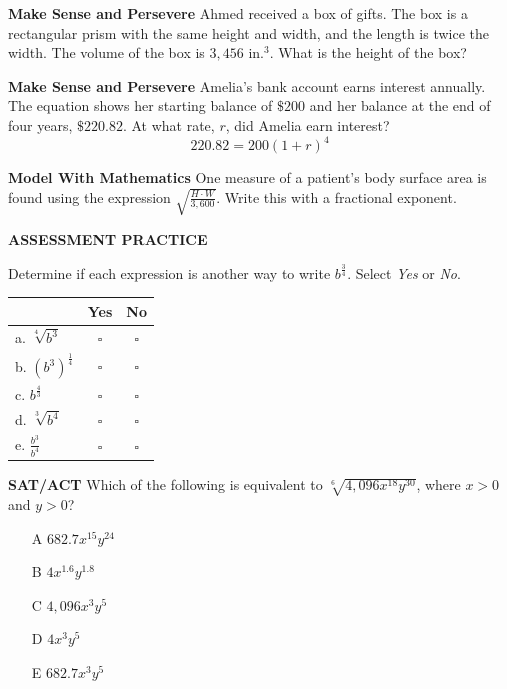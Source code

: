 \documentclass{article}
\newenvironment{practice}[2]{}{}
\newcommand{\placeholder}[2]{}
\begin{document}
\begin{practice}{45}{}
\textbf{Make Sense and Persevere} Ahmed received a box of gifts. The box is a rectangular prism with the same height and width, and the length is twice the width. The volume of the box is $3,456 \text{ in.}^3$. What is the height of the box?

\placeholder{illustration}{A rectangular prism box labeled 'Mystery BOX' with gifts flowing out. Dimensions marked: depth is $x \text{ in.}$, height is $x \text{ in.}$, width is $2x \text{ in.}$}
\end{practice}

\begin{practice}{46}{}
\textbf{Make Sense and Persevere} Amelia's bank account earns interest annually. The equation shows her starting balance of $\$200$ and her balance at the end of four years, $\$220.82$. At what rate, $r$, did Amelia earn interest?
\[ 220.82 = 200(1 + r)^4 \]
\end{practice}

\begin{practice}{47}{}
\textbf{Model With Mathematics} One measure of a patient's body surface area is found using the expression $\sqrt{\frac{H \cdot W}{3,600}}$. Write this with a fractional exponent.
\end{practice}

\textbf{ASSESSMENT PRACTICE}

\begin{practice}{48}{}
Determine if each expression is another way to write $b^{\frac{3}{4}}$. Select \textit{Yes} or \textit{No}.

\begin{tabular}{lcc}
\toprule
& \textbf{Yes} & \textbf{No} \\
\midrule
a. $\sqrt[4]{b^3}$ & $\square$ & $\square$ \\
b. $(b^3)^{\frac{1}{4}}$ & $\square$ & $\square$ \\
c. $b^{\frac{4}{3}}$ & $\square$ & $\square$ \\
d. $\sqrt[3]{b^4}$ & $\square$ & $\square$ \\
e. $\frac{b^3}{b^4}$ & $\square$ & $\square$ \\
\bottomrule
\end{tabular}
\end{practice}

\begin{practice}{49}{}
\textbf{SAT/ACT} Which of the following is equivalent to $\sqrt[6]{4,096x^{18}y^{30}}$, where $x > 0$ and $y > 0$?
\begin{enumerate}
    \item[A] $682.7x^{15}y^{24}$
    \item[B] $4x^{1.6}y^{1.8}$
    \item[C] $4,096x^3y^5$
    \item[D] $4x^3y^5$
    \item[E] $682.7x^3y^5$
\end{enumerate}
\end{practice}
\end{document}
